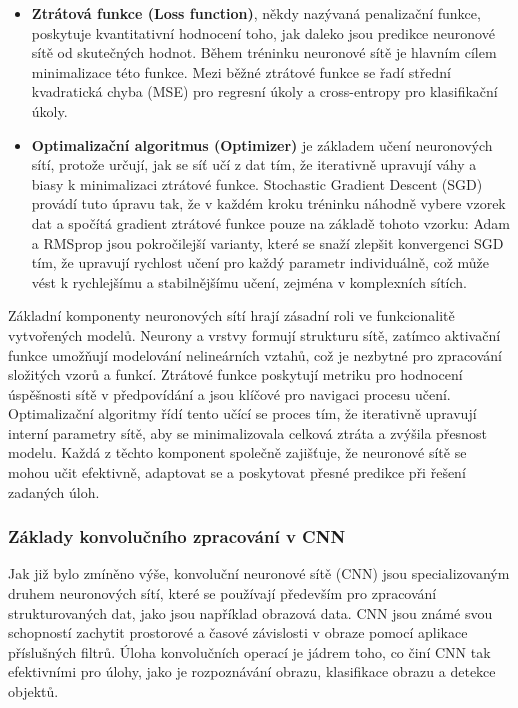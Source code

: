 \documentclass[male,czech,api_ing]{thesis}
\begin{document}
\begin{itemize}
    \item \textbf{Ztrátová funkce (Loss function)}, někdy nazývaná penalizační funkce, poskytuje kvantitativní hodnocení toho, jak daleko jsou predikce neuronové sítě od skutečných hodnot. Během tréninku neuronové sítě je hlavním cílem minimalizace této funkce. Mezi běžné ztrátové funkce se řadí střední kvadratická chyba (MSE) pro regresní úkoly a cross-entropy pro klasifikační úkoly. 
    \item \textbf{Optimalizační algoritmus (Optimizer)} je základem učení neuronových sítí, protože určují, jak se síť učí z dat tím, že iterativně upravují váhy a biasy k minimalizaci ztrátové funkce. Stochastic Gradient Descent (SGD) provádí tuto úpravu tak, že v každém kroku tréninku náhodně vybere vzorek dat a spočítá gradient ztrátové funkce pouze na základě tohoto vzorku:
    Adam a RMSprop jsou pokročilejší varianty, které se snaží zlepšit konvergenci SGD tím, že upravují rychlost učení pro každý parametr individuálně, což může vést k rychlejšímu a stabilnějšímu učení, zejména v komplexních sítích.
\end{itemize}

Základní komponenty neuronových sítí hrají zásadní roli ve funkcionalitě vytvořených modelů. Neurony a vrstvy formují strukturu sítě, zatímco aktivační funkce umožňují modelování nelineárních vztahů, což je nezbytné pro zpracování složitých vzorů a funkcí. Ztrátové funkce poskytují metriku pro hodnocení úspěšnosti sítě v předpovídání a jsou klíčové pro navigaci procesu učení. Optimalizační algoritmy řídí tento učící se proces tím, že iterativně upravují interní parametry sítě, aby se minimalizovala celková ztráta a zvýšila přesnost modelu. Každá z těchto komponent společně zajišťuje, že neuronové sítě se mohou učit efektivně, adaptovat se a poskytovat přesné predikce při řešení zadaných úloh. \cite{CNNConcepts, CNNConcepts2}

\subsubsection{Základy konvolučního zpracování v CNN}
Jak již bylo zmíněno výše, konvoluční neuronové sítě (CNN) jsou specializovaným druhem neuronových sítí, které se používají především pro zpracování strukturovaných dat, jako jsou například obrazová data. CNN jsou známé svou schopností zachytit prostorové a časové závislosti v obraze pomocí aplikace příslušných filtrů. Úloha konvolučních operací je jádrem toho, co činí CNN tak efektivními pro úlohy, jako je rozpoznávání obrazu, klasifikace obrazu a detekce objektů.
\end{document}
